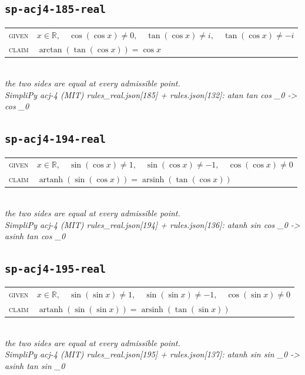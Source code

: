 \documentclass[11pt]{article}
\begin{document}
\subsection*{\texttt{sp-acj4-185-real}}
\begin{tabular}{@{}l@{\quad}l@{}}
\textsc{given} & $x \in \mathbb{R},\quad \cos\left(\cos x\right) \neq 0,\quad \tan\left(\cos x\right) \neq i,\quad \tan\left(\cos x\right) \neq -i$ \\[4pt]
\textsc{claim} & $\displaystyle \arctan\left(\tan\left(\cos x\right)\right) = \cos x$ \\
\end{tabular}\\[2pt]
{\small\emph{the two sides are equal at every admissible point.}}\\
\emph{SimpliPy acj-4 (MIT) rules\_real.json[185] + rules.json[132]: atan tan cos \_0  ->  cos \_0}\\

\subsection*{\texttt{sp-acj4-194-real}}
\begin{tabular}{@{}l@{\quad}l@{}}
\textsc{given} & $x \in \mathbb{R},\quad \sin\left(\cos x\right) \neq 1,\quad \sin\left(\cos x\right) \neq -1,\quad \cos\left(\cos x\right) \neq 0$ \\[4pt]
\textsc{claim} & $\displaystyle \operatorname{artanh}\left(\sin\left(\cos x\right)\right) = \operatorname{arsinh}\left(\tan\left(\cos x\right)\right)$ \\
\end{tabular}\\[2pt]
{\small\emph{the two sides are equal at every admissible point.}}\\
\emph{SimpliPy acj-4 (MIT) rules\_real.json[194] + rules.json[136]: atanh sin cos \_0  ->  asinh tan cos \_0}\\

\subsection*{\texttt{sp-acj4-195-real}}
\begin{tabular}{@{}l@{\quad}l@{}}
\textsc{given} & $x \in \mathbb{R},\quad \sin\left(\sin x\right) \neq 1,\quad \sin\left(\sin x\right) \neq -1,\quad \cos\left(\sin x\right) \neq 0$ \\[4pt]
\textsc{claim} & $\displaystyle \operatorname{artanh}\left(\sin\left(\sin x\right)\right) = \operatorname{arsinh}\left(\tan\left(\sin x\right)\right)$ \\
\end{tabular}\\[2pt]
{\small\emph{the two sides are equal at every admissible point.}}\\
\emph{SimpliPy acj-4 (MIT) rules\_real.json[195] + rules.json[137]: atanh sin sin \_0  ->  asinh tan sin \_0}\\
\end{document}
